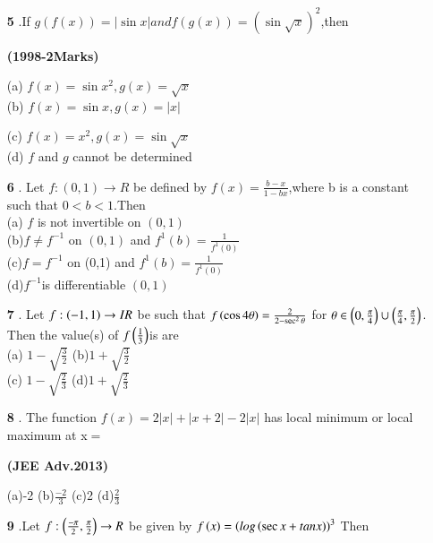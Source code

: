 \documentclass[journal,12pt,twocolumn]{IEEEtran}
\theoremstyle{remark}
\begin{document}
\begin{enumerate}
(c) does not exist because $f$ is not one$-$one\\
(d) does not exist because $f$ is not onto\\

\item[\textbf{5}].If $g(f(x))=|{\sin{x}}| and f(g(x))=(\sin{\sqrt{x}})^2$,then

\hfill\textbf{(1998-2Marks)}

(a) $f(x)=\sin{x}^2,g(x)=\sqrt{x}$\\
(b) $f(x)=\sin{x},g(x)=|x|$

(c) $f(x)=x^2,g(x)=\sin{\sqrt{x}}$\\
(d) $f$ and $g$ cannot be determined\\

\item[\textbf{6}]. Let $f:(0,1)\rightarrow{R}$ be defined by $f(x)=\frac{b-x}{1-bx}$,where b is a constant such that $0<b<1$.Then\\
(a) $f$ is not invertible  on $(0,1)$\\
(b)$f\neq{f^{-1}}$ on $(0,1)$ and $f^{1}(b)=\frac{1}{f^{1}(0)}$\\
(c)$f=f^{-1}$ on (0,1) and $f^{1}(b)=\frac{1}{f^{1}(0)}$\\
(d)$f^{-1} $is differentiable $(0,1)$\\
\newpage
\item[\textbf{7}]. Let $f:\left(-1,1\right)\rightarrow{IR}$ be  such that $f\left(\cos{4\theta}\right) =\frac{2}{2-\sec^2{\theta}}$ for $\theta \in \left(0,\frac{\pi}{4}\right)\cup\left(\frac{\pi}{4},\frac{\pi}{2}\right)$. Then the value(s) of $f\left(\frac{1}{3}\right)$is are\\
(a) $1-\sqrt{\frac{3}{2}}$  \hspace{1cm} (b)$1+\sqrt{\frac{3}{2}}$\\
(c) $1-\sqrt{\frac{2}{3}}$   \hspace{1cm} (d)$1+\sqrt{\frac{2}{3}}$\\

\item[\textbf{8}]. The function $f(x)=2|x|+|x+2|-2|x|$ has local minimum or local maximum at x$=$

\hfill\textbf{(JEE Adv.2013)}

(a)-2\hspace{1cm}
(b)$\frac{-2}{3}$\hspace{1cm}
(c)2\hspace{1cm}
(d)$\frac{2}{3}$\\

\item[\textbf{9}].Let $f:\left(\frac{-\pi}{2},\frac{\pi}{2}\right)\rightarrow{R}$ be given by $f\left(x\right)=\left(log\left(\sec{x}+tan{x}\right)\right)^3$ Then


\end{enumerate}
\end{document}
